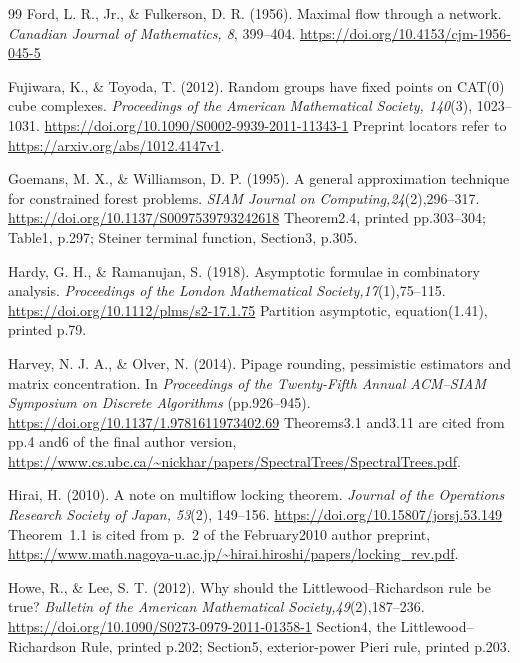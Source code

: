 \begin{thebibliography}{99}
Ford, L. R., Jr., \& Fulkerson, D. R. (1956).
Maximal flow through a network.
\emph{Canadian Journal of Mathematics, 8}, 399--404.
\url{https://doi.org/10.4153/cjm-1956-045-5}

Fujiwara, K., \& Toyoda, T. (2012).
Random groups have fixed points on CAT(0) cube complexes.
\emph{Proceedings of the American Mathematical Society, 140}(3),
1023--1031. \url{https://doi.org/10.1090/S0002-9939-2011-11343-1}
Preprint locators refer to \url{https://arxiv.org/abs/1012.4147v1}.

Goemans, M. X., \& Williamson, D. P. (1995).
A general approximation technique for constrained forest problems.
\emph{SIAM Journal on Computing,24}(2),296--317.
\url{https://doi.org/10.1137/S0097539793242618}
Theorem2.4, printed pp.303--304; Table1, p.297;
Steiner terminal function, Section3, p.305.

Hardy, G. H., \& Ramanujan, S. (1918).
Asymptotic formulae in combinatory analysis.
\emph{Proceedings of the London Mathematical Society,17}(1),75--115.
\url{https://doi.org/10.1112/plms/s2-17.1.75}
Partition asymptotic, equation(1.41), printed p.79.

Harvey, N. J. A., \& Olver, N. (2014). Pipage rounding,
pessimistic estimators and matrix concentration. In \emph{Proceedings
of the Twenty-Fifth Annual ACM--SIAM Symposium on Discrete Algorithms}
(pp.926--945). \url{https://doi.org/10.1137/1.9781611973402.69}
Theorems3.1 and3.11 are cited from pp.4 and6 of the final author version,
\url{https://www.cs.ubc.ca/~nickhar/papers/SpectralTrees/SpectralTrees.pdf}.

Hirai, H. (2010). A note on multiflow locking theorem.
\emph{Journal of the Operations Research Society of Japan, 53}(2),
149--156. \url{https://doi.org/10.15807/jorsj.53.149}
Theorem~1.1 is cited from p.~2 of the February2010 author preprint,
\url{https://www.math.nagoya-u.ac.jp/~hirai.hiroshi/papers/locking_rev.pdf}.

Howe, R., \& Lee, S. T. (2012). Why should the Littlewood--Richardson
rule be true? \emph{Bulletin of the American Mathematical Society,49}(2),187--236.
\url{https://doi.org/10.1090/S0273-0979-2011-01358-1}
Section4, the Littlewood--Richardson Rule, printed p.202;
Section5, exterior-power Pieri rule, printed p.203.


\end{thebibliography}
